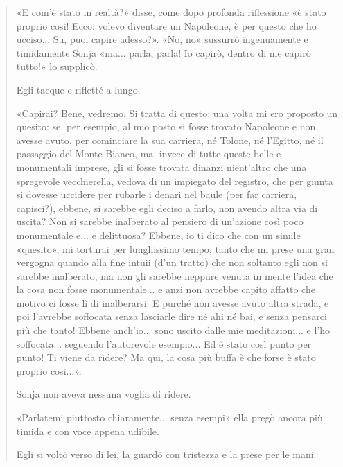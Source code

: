 \documentclass{book}
\begin{document}
\begin{quote}
«E com'è stato in realtà?» disse, come dopo profonda riflessione «è stato proprio così! Ecco:
volevo diventare un Napoleone, è per questo che ho ucciso... Su, puoi capire adesso?».
«No, no» sussurrò ingenuamente e timidamente Sonja «ma... parla, parla! Io capirò, dentro di me
capirò tutto!» lo supplicò.

Egli tacque e rifletté a lungo.

«Capirai? Bene, vedremo. Si tratta di questo: una volta mi ero proposto un quesito: se, per
esempio, al mio posto si fosse trovato Napoleone e non avesse avuto, per cominciare la sua
carriera, né Tolone, né l'Egitto, né il passaggio del Monte Bianco, ma, invece di tutte queste
belle e monumentali imprese, gli si fosse trovata dinanzi nient'altro che una spregevole
vecchierella, vedova di un impiegato del registro, che per giunta si dovesse uccidere per rubarle
i denari nel baule (per far carriera, capisci?), ebbene, si sarebbe egli deciso a farlo, non avendo
altra via di uscita? Non si sarebbe inalberato al pensiero di un'azione così poco monumentale
e... e delittuosa? Ebbene, io ti dico che con un simile «quesito», mi torturai per lunghissimo
tempo, tanto che mi prese una gran vergogna quando alla fine intuii (d'un tratto) che non
soltanto egli non si sarebbe inalberato, ma non gli sarebbe neppure venuta in mente l'idea che
la cosa non fosse monumentale... e anzi non avrebbe capito affatto che motivo ci fosse lì di
inalberarsi. E purché non avesse avuto altra strada, e poi l'avrebbe soffocata senza lasciarle dire
né ahi né bai, e senza pensarci più che tanto! Ebbene anch'io... sono uscito dalle mie
meditazioni... e l'ho soffocata... seguendo l'autorevole esempio... Ed è stato così punto per
punto! Ti viene da ridere? Ma qui, la cosa più buffa è che forse è stato proprio così...».

Sonja non aveva nessuna voglia di ridere.

«Parlatemi piuttosto chiaramente... senza esempi» ella pregò ancora più timida e con voce
appena udibile.

Egli si voltò verso di lei, la guardò con tristezza e la prese per le mani.


\end{quote}
\end{document}
